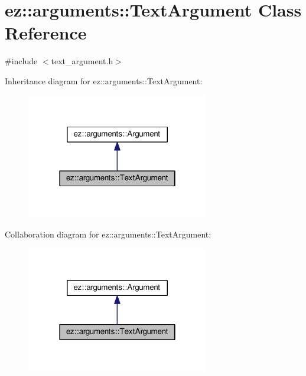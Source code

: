 \hypertarget{classez_1_1arguments_1_1TextArgument}{}\section{ez\+:\+:arguments\+:\+:Text\+Argument Class Reference}
\label{classez_1_1arguments_1_1TextArgument}


{\ttfamily \#include $<$text\+\_\+argument.\+h$>$}



Inheritance diagram for ez\+:\+:arguments\+:\+:Text\+Argument\+:
\nopagebreak
\begin{figure}[H]
\begin{center}
\leavevmode
\includegraphics[width=226pt]{classez_1_1arguments_1_1TextArgument__inherit__graph}
\end{center}
\end{figure}


Collaboration diagram for ez\+:\+:arguments\+:\+:Text\+Argument\+:
\nopagebreak
\begin{figure}[H]
\begin{center}
\leavevmode
\includegraphics[width=226pt]{classez_1_1arguments_1_1TextArgument__coll__graph}
\end{center}
\end{figure}
